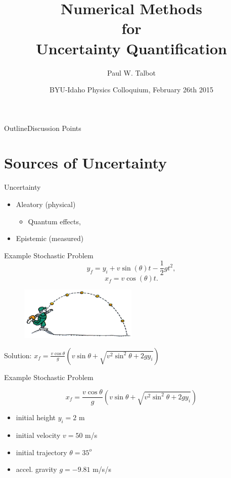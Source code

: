 \documentclass{beamer}
\title[Numerical UQ Methods] %
{Numerical Methods\\ for\\ Uncertainty Quantification}
\author[Talbot] %
{Paul W. Talbot\inst{1}}
\institute[University of New Mexico] %
{
  \inst{1}%
  University of New Mexico\\
   \vspace{10pt}
\footnotesize{Supported by Idaho National Laboratory}
}
\date[BYU-I, 2014] %
{BYU-Idaho Physics Colloquium, February 26th 2015}
\begin{document}
\begin{frame}
  \titlepage
\end{frame}

\begin{frame}{Outline}{Discussion Points}\vspace{-20pt}
  \tableofcontents[pausesections]
\end{frame}

\section{Sources of Uncertainty}
\begin{frame}{Uncertainty}
\begin{itemize}
\item Aleatory (physical)
\begin{itemize}
  \item Quantum effects, 
\end{itemize}
\item Epistemic (measured)
\end{itemize}
\end{frame}

\begin{frame}{Example Stochastic Problem}\vspace{-30pt}
\begin{equation}
y_f=y_i + v\sin(\theta)t - \frac{1}{2}gt^2,
\end{equation}
\begin{equation}
x_f=v\cos(\theta)t.
\end{equation}
  \begin{figure}[h!]
    \centering
      \includegraphics[width=0.5\textwidth]{../graphics/projectile}
  \end{figure}
\vspace{-10pt}
Solution: $x_f=\frac{v\cos{\theta}}{g}\left(v\sin\theta+\sqrt{v^2\sin^2\theta + 2gy_i}\right)$
\end{frame}

\begin{frame}{Example Stochastic Problem}\vspace{-50pt}

\begin{equation}
x_f=\frac{v\cos{\theta}}{g}\left(v\sin\theta+\sqrt{v^2\sin^2\theta + 2gy_i}\right)
\end{equation}
\begin{itemize}
\item initial height $y_i = 2$ m
\item initial velocity $v = 50$ m/s
\item initial trajectory $\theta = 35^o$
\item accel. gravity $g = -9.81$ m/s/s
\end{itemize}
\end{frame}
\end{document}
